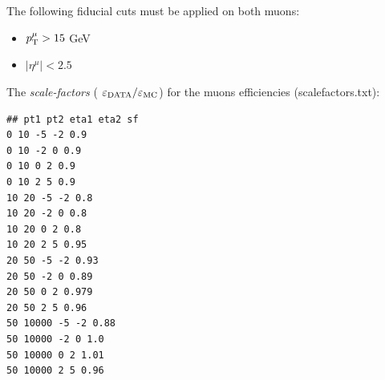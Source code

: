 \documentclass[a4paper,11pt]{article}
\begin{document}
The following fiducial cuts must be applied on both muons:
\begin{itemize}
	\item $p_\textup{T}^\mu >15 $ GeV 
	\item $|\eta^\mu| < 2.5 $
\end{itemize}

The \emph{scale-factors} ( $\varepsilon_\textup{DATA} / \varepsilon_\textup{MC}$) for the muons efficiencies (scalefactors.txt):
\begin{verbatim}
## pt1 pt2 eta1 eta2 sf
0 10 -5 -2 0.9
0 10 -2 0 0.9
0 10 0 2 0.9
0 10 2 5 0.9
10 20 -5 -2 0.8
10 20 -2 0 0.8
10 20 0 2 0.8
10 20 2 5 0.95
20 50 -5 -2 0.93
20 50 -2 0 0.89
20 50 0 2 0.979
20 50 2 5 0.96
50 10000 -5 -2 0.88
50 10000 -2 0 1.0
50 10000 0 2 1.01
50 10000 2 5 0.96
\end{verbatim}

\FloatBarrier
\nocite{*}
%


\cleardoublepage
\end{document}
